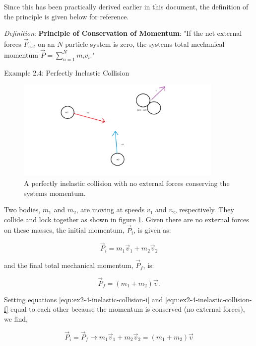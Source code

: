 
Since this has been practically derived earlier in this document, the definition of the principle is given below for reference.

{\itshape Definition}: {\bfseries Principle of Conservation of Momentum}: "If the net external forces $\vec{F}_{ext}$ on an $N$-particle system is zero, the systems total mechanical momentum $\vec{P} = \sum_{n=1}^{N} m_i v_i$."

{\exbegin Example 2.4: Perfectly Inelastic Collision}

\begin{figure}[h]
    \centering
    \includegraphics[width=10cm]{Classical_Mechanics/2.4-momentum/ex-inelastic-coll.png}
    \caption{A perfectly inelastic collision with no external forces conserving the systems momentum.}
    \label{fig:ex-inelastic-coll}
\end{figure}

Two bodies, $m_1$ and $m_2$, are moving at speeds $v_1$ and $v_2$, respectively. They collide and lock together as shown in figure \ref{fig:ex-inelastic-coll}. Given there are no external forces on these masses, the initial momentum, $\vec{P}_i$, is given as:

\begin{equation}
    \vec{P}_i = m_1 \vec{v}_1 + m_2 \vec{v}_2
    \label{eqn:ex2-4-inelastic-collision-i}
\end{equation}

\noindent and the final total mechanical momentum, $\vec{P}_f$, is:

\begin{equation}
    \vec{P}_f = (m_1 + m_2) \vec{v}.
    \label{eqn:ex2-4-inelastic-collision-f}
\end{equation}

Setting equations \ref{eqn:ex2-4-inelastic-collision-i} and \ref{eqn:ex2-4-inelastic-collision-f} equal to each other because the momentum is conserved (no external forces), we find,

\begin{equation*}
    \vec{P}_i = \vec{P}_f \rightarrow m_1 \vec{v}_1 + m_2 \vec{v}_2 = (m_1 + m_2)\vec{v}
\end{equation*}

